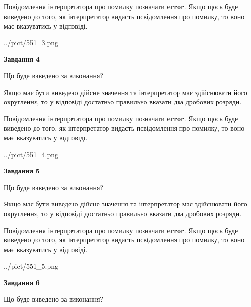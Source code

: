 \documentclass[12pt, ukrainian]{article}
\begin{document}
{\begin {Large}
Повідомлення інтерпретатора про помилку позначати \textbf{error}.
Якщо щось буде виведено до того, як інтерпретатор видасть повідомлення про помилку, 
то воно має вказуватись у відповіді. \par

\begin{center}
	{../pict/551_3.png}
\end{center}
\newpage

{\begin {center}\textbf{Завдання 4}\end {center}}\par
Що буде виведено за виконання? \par

Якщо має бути виведено дійсне значення та інтерпретатор має здійснювати його округлення, 
то у відповіді достатньо правильно вказати два дробових розряди.

Повідомлення інтерпретатора про помилку позначати \textbf{error}.
Якщо щось буде виведено до того, як інтерпретатор видасть повідомлення про помилку, 
то воно має вказуватись у відповіді. \par

\begin{center}
	{../pict/551_4.png}
\end{center}
\newpage

{\begin {center}\textbf{Завдання 5}\end {center}}\par
Що буде виведено за виконання? \par

Якщо має бути виведено дійсне значення та інтерпретатор має здійснювати його округлення, 
то у відповіді достатньо правильно вказати два дробових розряди.

Повідомлення інтерпретатора про помилку позначати \textbf{error}.
Якщо щось буде виведено до того, як інтерпретатор видасть повідомлення про помилку, 
то воно має вказуватись у відповіді. \par

\begin{center}
	{../pict/551_5.png}
\end{center}
\newpage

{\begin {center}\textbf{Завдання 6}\end {center}}\par
Що буде виведено за виконання? \par


\end{Large}}
\end{document}
